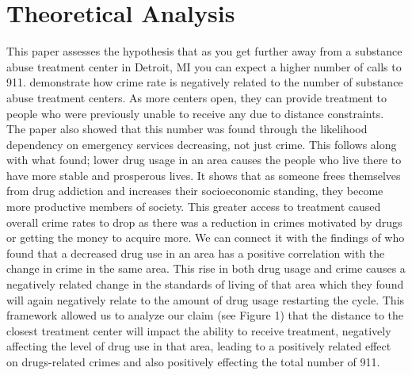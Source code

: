 \documentclass[12pt]{article}
\begin{document}
\section{Theoretical Analysis}
\label{sec:theory}
This paper assesses the hypothesis that as you get further away from a substance abuse treatment center in Detroit, MI you can expect a higher number of calls to 911. \cite{SAT_centers_and_crime} demonstrate how crime rate is negatively related to the number of substance abuse treatment centers. As more centers open, they can provide treatment to people who were previously unable to receive any due to distance constraints. The paper also showed that this number was found through the likelihood dependency on emergency services decreasing, not just crime. This follows along with what \cite{Socioeconomic-Determinants} found;  lower drug usage in an area causes the people who live there to have more stable and prosperous lives. It shows that as someone frees themselves from drug addiction and increases their socioeconomic standing, they become more productive members of society. This greater access to treatment caused overall crime rates to drop as there was a reduction in crimes motivated by drugs or getting the money to acquire more. We can connect it with the findings of \cite{drugs_and_crime} who found that a decreased drug use in an area has a positive correlation with the change in crime in the same area. This rise in both drug usage and crime causes a negatively related change in the standards of living of that area which they found will again negatively relate to the amount of drug usage restarting the cycle. This framework allowed us to analyze our claim (see Figure 1) that the distance to the closest treatment center will impact the ability to receive treatment, negatively affecting the level of drug use in that area, leading to a positively related effect on drugs-related crimes and also positively effecting the total number of 911. 
\vspace{0.5cm}
\begin{figure}[h!]
\caption{} 
\vspace{0.5cm}
\end{figure}
\end{document}
